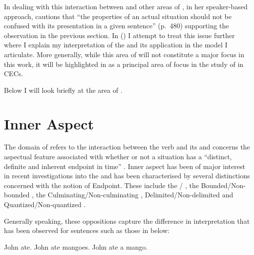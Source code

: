 In dealing with this interaction between  and other areas of
, \citet{Smith1983} in her speaker-based approach, cautions that ``the
properties of an actual situation should not be confused with its presentation
in a given sentence'' (p.~480) supporting the observation in the previous
section. In  () I attempt to treat this issue
further where I explain my interpretation of the  and its
application in the model I articulate. More generally, while this area of 
will not constitute a major focus in this work, it will be highlighted in
 as a principal area of focus in the study of  in CECs.

Below I will look briefly at the area of .

\section{Inner Aspect}\label{sec:1.3}\largerpage[2]

The domain of  refers to the interaction between the verb and its
 and concerns the aspectual feature associated with whether or
not a situation has a ``distinct, definite and inherent endpoint in time''
\citep[4]{Tenny1994}.  Inner aspect has been of major interest in recent
investigations into the  and has been characterised by
several distinctions concerned with the notion of Endpoint.  These include the
\slash {} \citealt{Garey1957,Comrie1976,Smith1991, Rothstein2004},
the Bounded\slash Non-bounded \citep{Verkuyl1972,Dahl1981,Dahl1985,Jackendoff1990,Krifka1998}, 
the Culminating\slash Non-cul\-mi\-na\-ting \citep{MoensSteedman1988}, Delimited\slash Non-delimited
\citep{Mourelatos1981,Tenny1994} and Quantized\slash Non-quantized
\citep{Krifka2001, Filip2000}.

Generally speaking, these oppositions capture the difference in interpretation
that has been observed for sentences such as those in  below:

\ea\label{ex:1:6}
  \ea John ate.
  \ex John ate mangoes.
  \ex John ate a mango.
  \z
\z

